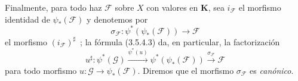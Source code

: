 \begin{env}[3.5.4]
Finalmente, para todo haz $\mathcal{F}$ sobre $X$ con valores en
$\boldsymbol{K}$, sea $i_{\mathcal{F}}$ el morfismo identidad de
$\psi_*(\mathcal{F})$ y denotemos por
\[
  \sigma_{\mathcal{F}}:
  \psi^*(\psi_*(\mathcal{F}))\to\mathcal{F}
\]
el morfismo $(i_{\mathcal{F}})^\sharp$~; la fórmula (3.5.4.3) da, en
particular, la factorización
\begin{equation*}
  u^\sharp:\psi^*(\mathcal{G})
  \xrightarrow{\psi^*(u)}
  \psi^*(\psi_*(\mathcal{F}))
  \xrightarrow{\sigma_{\mathcal{F}}}\mathcal{F}
\tag{3.5.4.4}\label{0.3.5.4.4-fr}
\end{equation*}
para todo morfismo $u:\mathcal{G}\to\psi_*(\mathcal{F})$. Diremos que el
morfismo $\sigma_{\mathcal{F}}$ es \emph{canónico}.
\end{env}
